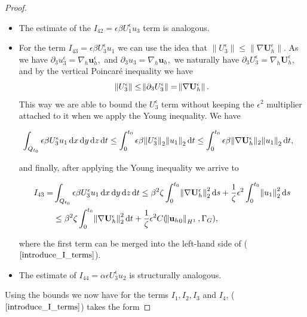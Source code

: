 \documentclass[11pt]{article}
\newcommand*\diff{\mathop{}\!\mathrm{d}}
\begin{document}
\begin{proof}
\begin{itemize}
      \item The estimate of the $ I_{42} = \epsilon \beta U_1^\epsilon u_3$ term is analogous.
      
      \item For the term $ I_{43} = \epsilon \beta U_3^\epsilon u_1$ we can use the idea that $\| U_3^\epsilon \| \leq \| \nabla \mathbf{U}_h^\epsilon \|.$ As we have $\partial_3 u_3^\epsilon = \nabla_h \mathbf{u}_h^\epsilon,$ and $\partial_3 u_3 = \nabla_h \mathbf{u}_h,$ we naturally have $\partial_3 U_3^\epsilon = \nabla_h \mathbf{U}_h^\epsilon,$ and by the vertical Poincar\'e inequality we have $$\norm{U_3^\epsilon} \leq \norm{\partial_3 U_3^\epsilon} = \norm{\nabla \mathbf{U}_h^\epsilon}.$$ This way we are able to bound the $U_3^\epsilon$ term without keeping the $\epsilon^2$ multiplier attached to it when we apply the Young inequality. We have
      
      $$ \hspace{-1em}\int_{Q_{t_0}} \epsilon \beta U_3^\epsilon u_1 \diff x \diff y \diff z \diff t \leq \int_0^{t_0} \epsilon \beta \norm{U_3^\epsilon}_2 \norm{u_1}_2 \diff t \leq \int_0^{t_0} \epsilon \beta \| \nabla \mathbf{U}_h^\epsilon \|_2 \norm{u_1}_2 \diff t, $$
      
      and finally, after applying the Young inequality we arrive to
      
      \begin{equation}
        \begin{split}
          I_{43} = & \int_{Q_{t_0}} \epsilon \beta U_3^\epsilon u_1 \diff x \diff y \diff z \diff t \leq \beta^2 \zeta \int_0^{t_0} \norm{\nabla \mathbf{U}_h^\epsilon}_2^2 \diff s+ \frac{1}{\zeta} \epsilon^2 \int_0^{t_0} \norm{u_1}_2^2 \diff s \\
          & \leq \beta^2 \zeta \int_0^{t_0} \norm{\nabla \mathbf{U}_h^\epsilon}_2^2 \diff t + \frac{1}{\zeta} \epsilon^2 C(\norm{{\mathbf{u}_h}_0}_{H^1}, \Gamma_G),
        \end{split}
      \end{equation}
      
      where the first term can be merged into the left-hand side of ($\ref{introduce_I_terms}$).
            
      \item The estimate of $ I_{44} = \alpha \epsilon U_3^\epsilon u_2$ is structurally analogous.
    
    \end{itemize}
    
Using the bounds we now have for the terms $I_1, I_2, I_3$ and $I_4$, ($\ref{introduce_I_terms}$) takes the form


\end{proof}
\end{document}

